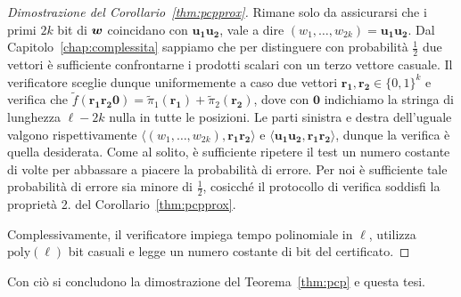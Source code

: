 \begin{proof}[Dimostrazione del Corollario~\ref{thm:pcpprox}]
	Rimane solo da assicurarsi che i primi $2 k$
	bit di $\bm{w}$ coincidano con $\bm{u_1 u_2}$, vale a dire
	$(w_1, \dots, w_{2 k}) = \bm{u_1 u_2}$.
	Dal Capitolo~\ref{chap:complessita} sappiamo che per distinguere con
	probabilità $\frac12$ due vettori è sufficiente confrontarne i prodotti
	scalari con un terzo vettore casuale.
	Il verificatore sceglie dunque uniformemente a caso due vettori
	$\bm{r_1}, \bm{r_2} \in \{0, 1\}^k$ e verifica che
	$\tilde{f}(\bm{r_1 r_2 0}) = \tilde{\pi}_1 (\bm{r_1})
	+ \tilde{\pi}_2 (\bm{r_2})$, dove con $\bm{0}$ indichiamo la stringa di
	lunghezza $\ell - 2 k$ nulla in tutte le posizioni.
	Le parti sinistra e destra dell'uguale valgono rispettivamente
	$\langle (w_1, \dots, w_{2 k}), \bm{r_1 r_2} \rangle$ e
	$\langle \bm{u_1 u_2}, \bm{r_1 r_2} \rangle$, dunque la verifica è quella
	desiderata. Come al solito, è sufficiente ripetere il test un numero
	costante di volte per abbassare a piacere la probabilità di errore. Per noi
	è sufficiente tale probabilità di errore sia minore di $\frac12$, cosicché
	il protocollo di verifica soddisfi la proprietà 2. del
	Corollario~\ref{thm:pcpprox}.

	Complessivamente, il verificatore impiega tempo polinomiale in $\ell$,
	utilizza $\mathrm{poly}(\ell)$ bit casuali e legge un numero costante di bit
	del certificato.
\end{proof}

Con ciò si concludono la dimostrazione del Teorema~\ref{thm:pcp} e questa tesi.
